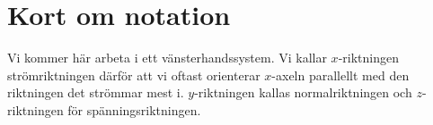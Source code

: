 \section{Kort om notation}

Vi kommer här arbeta i ett vänsterhandssystem. Vi kallar $x$-riktningen strömriktningen därför att vi oftast orienterar $x$-axeln parallellt med den riktningen det strömmar mest i. $y$-riktningen kallas normalriktningen och $z$-riktningen för spänningsriktningen.